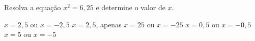 Resolva a equação $x^2=6{,}25$ e determine o valor de $x$.

$x=2{,}5$ ou $x=-2{,}5$
$x=2{,}5$, apenas
$x=25$ ou $x=-25$
$x=0{,}5$ ou $x=-0{,}5$
$x=5$ ou $x=-5$


